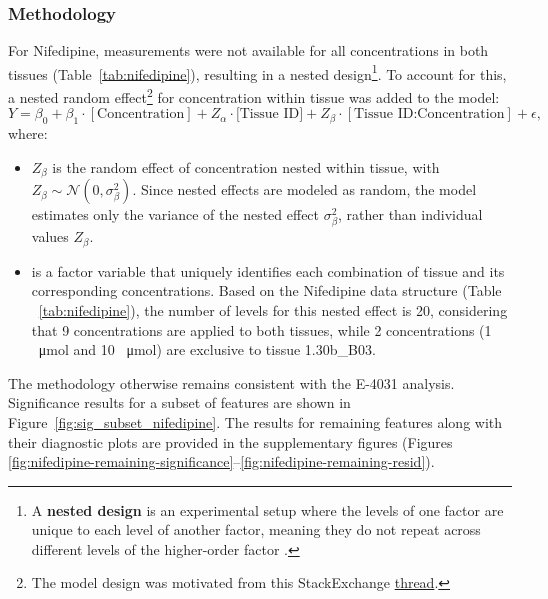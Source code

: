 \documentclass{report}
\begin{document}
        \subsubsection{Methodology}
            \label{nifedipine-sig-methodology}
            For Nifedipine, measurements were not available for all concentrations in both tissues (Table~\ref{tab:nifedipine}), resulting in a nested design\footnote{A \textbf{nested design} is an experimental setup where the levels of one factor are unique to each level of another factor, meaning they do not repeat across different levels of the higher-order factor \cite{nestedcrossed}.}. To account for this, a nested random effect\footnote{The model design was motivated from this StackExchange \href{https://stats.stackexchange.com/questions/630358/how-to-handle-pseudoreplication-aggregate-observations-per-group-for-linear-mi?fbclid=IwY2xjawHCF1hleHRuA2FlbQIxMAABHcBmtcQyzFZ_QiBUKlHD6kRFqbgdVj-UZTF8316U_KKMeWe5sUYCXl0TwQ_aem_qwBMa6uYIez1NB2aRHz5vQ}{thread}.} for concentration within tissue was added to the model:
            \[
            Y = \beta_0 + \beta_1 \cdot [\text{Concentration}] + Z_\alpha \cdot \text{[Tissue ID]} + Z_\beta \cdot [\text{Tissue ID:Concentration}] + \epsilon,
            \]
            where:
            \begin{itemize}
                \item \(Z_\beta\) is the random effect of concentration nested within tissue, with \(Z_\beta \sim \mathcal{N}(0, \sigma_\beta^2)\). Since nested effects are modeled as random, the model estimates only the variance of the nested effect $\sigma_\beta^2$, rather than individual values $Z_\beta$.
                \item {} is a factor variable that uniquely identifies each combination of tissue and its corresponding concentrations. Based on the Nifedipine data structure (Table ~\ref{tab:nifedipine}), the number of levels for this nested effect is 20, considering that 9 concentrations are applied to both tissues, while 2 concentrations (1 \SI{}{\umol} and 10 \SI{}{\umol}) are exclusive to tissue 1.30b\_B03.
            \end{itemize}
            
            The methodology otherwise remains consistent with the E-4031 analysis. Significance results for a subset of features are shown in Figure~\ref{fig:sig_subset_nifedipine}. The results for remaining features along with their diagnostic plots are provided in the supplementary figures (Figures \ref{fig:nifedipine-remaining-significance}--\ref{fig:nifedipine-remaining-resid}).
            
\end{document}
